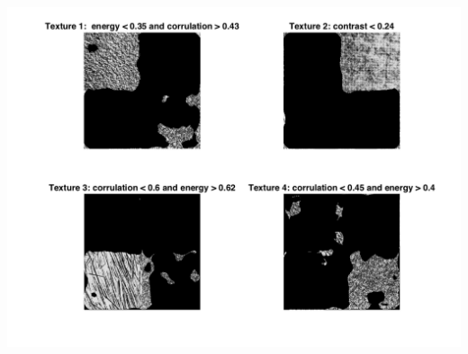 \documentclass{article}
\begin{document}
\includegraphics[totalheight=10cm]{img1tplot.png}
\end{document}
